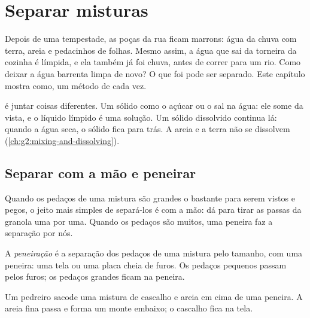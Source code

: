 \chapter{Separar misturas}\label{ch:g3:separating-mixtures}

Depois de uma tempestade, as poças da rua ficam marrons: água da chuva
 com terra, areia e pedacinhos de folhas. Mesmo assim, a água
que sai da torneira da cozinha é límpida, e ela também já foi chuva,
antes de correr para um rio. Como deixar a água barrenta limpa de novo?
O que foi  pode ser separado. Este capítulo mostra como, um
método de cada vez.

\begin{recall}
 é juntar coisas diferentes. Um sólido como o açúcar ou o sal  na água: ele some da vista, e o líquido límpido é uma solução.
Um sólido dissolvido continua lá: quando a água seca, o sólido fica para
trás. A areia e a terra não se dissolvem
(\cref{ch:g2:mixing-and-dissolving}).
\end{recall}

\section{Separar com a mão e peneirar}

Quando os pedaços de uma mistura são grandes o bastante para serem
vistos e pegos, o jeito mais simples de separá-los é com a mão: dá para
tirar as passas da granola uma por uma. Quando os pedaços são muitos,
uma peneira faz a separação por nós.

\begin{definition}[Peneiração]\label{def:g3:separating-mixtures:sieve}
A \emph{peneiração} é a separação dos pedaços de uma
mistura pelo tamanho, com uma peneira: uma tela ou uma placa cheia de
furos. Os pedaços pequenos passam pelos furos; os pedaços grandes ficam
na peneira.
\end{definition}

\begin{example}\label{ex:g3:separating-mixtures:gravel}
Um pedreiro sacode uma mistura de cascalho e areia em cima de uma
peneira. A areia fina passa e forma um monte embaixo; o cascalho fica na
tela.
\end{example}

